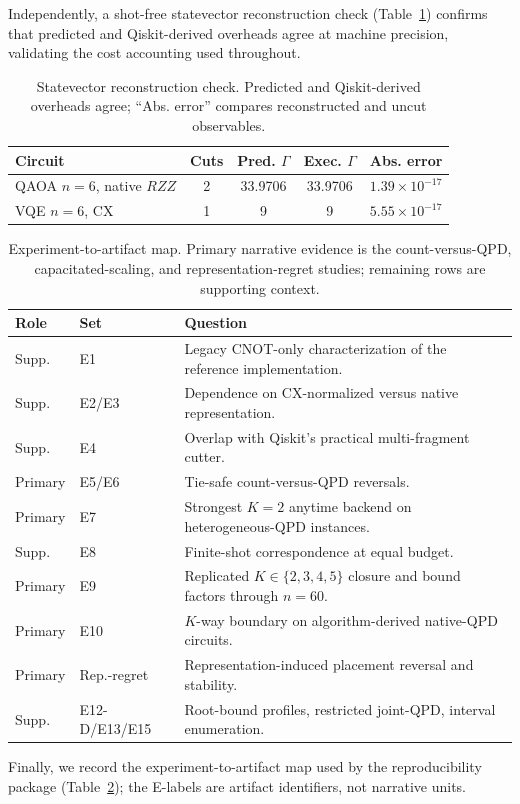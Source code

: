 \documentclass[
  aps,
  pra,
  reprint,
  amsmath,
  amssymb,
  longbibliography,
  nofootinbib,
  floatfix
]{revtex4-2}
\theoremstyle{plain}
\newcommand{\tabfit}[1]{{\footnotesize #1}}
\begin{document}
Independently, a shot-free statevector reconstruction check (Table~\ref{tab:operational}) confirms that predicted and Qiskit-derived overheads agree at machine precision, validating the cost accounting used throughout.

\begin{table}[t]
\centering
\caption{Statevector reconstruction check. Predicted and Qiskit-derived overheads agree; ``Abs. error'' compares reconstructed and uncut observables.}
\label{tab:operational}
\tabfit{%
\begin{tabular}{lcccc}
\toprule
\textbf{Circuit} & \textbf{Cuts} & \textbf{Pred. $\Gamma$} & \textbf{Exec. $\Gamma$} & \textbf{Abs. error}\\
\midrule
QAOA $n\!=\!6$, native $RZZ$ & 2 & 33.9706 & 33.9706 & $1.39\!\times\!10^{-17}$\\
VQE $n\!=\!6$, CX             & 1 & 9       & 9       & $5.55\!\times\!10^{-17}$\\
\bottomrule
\end{tabular}
}
\end{table}

\begin{table}[b]
\centering
\caption{Experiment-to-artifact map. Primary narrative evidence is the count-versus-QPD, capacitated-scaling, and representation-regret studies; remaining rows are supporting context.}
\label{tab:experiment-map}
\tabfit{%
\begin{tabular}{llp{}}
\toprule
\textbf{Role} & \textbf{Set} & \textbf{Question}\\
\midrule
Supp. & E1 & Legacy CNOT-only characterization of the reference implementation.\\
Supp. & E2/E3 & Dependence on CX-normalized versus native representation.\\
Supp. & E4 & Overlap with Qiskit's practical multi-fragment cutter.\\
Primary & E5/E6 & Tie-safe count-versus-QPD reversals.\\
Primary & E7 & Strongest $K=2$ anytime backend on heterogeneous-QPD instances.\\
Supp. & E8 & Finite-shot correspondence at equal budget.\\
Primary & E9 & Replicated $K\in\{2,3,4,5\}$ closure and bound factors through $n=60$.\\
Primary & E10 & $K$-way boundary on algorithm-derived native-QPD circuits.\\
Primary & Rep.-regret & Representation-induced placement reversal and stability.\\
Supp. & E12-D/E13/E15 & Root-bound profiles, restricted joint-QPD, interval enumeration.\\
\bottomrule
\end{tabular}
}
\end{table}

Finally, we record the experiment-to-artifact map used by the reproducibility package (Table~\ref{tab:experiment-map}); the E-labels are artifact identifiers, not narrative units.


\end{document}
